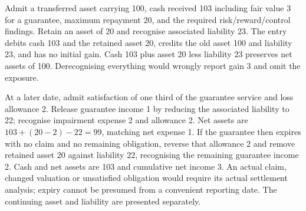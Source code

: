 Admit a transferred asset carrying 100, cash received 103 including fair value 3 for a guarantee, maximum repayment 20, and the required risk/reward/control findings. Retain an asset of 20 and recognise associated liability 23. The entry debits cash 103 and the retained asset 20, credits the old asset 100 and liability 23, and has no initial gain. Cash 103 plus asset 20 less liability 23 preserves net assets of 100. Derecognising everything would wrongly report gain 3 and omit the exposure.

At a later date, admit satisfaction of one third of the guarantee service and loss allowance 2. Release guarantee income 1 by reducing the associated liability to 22; recognise impairment expense 2 and allowance 2. Net assets are \(103+(20-2)-22=99\), matching net expense 1. If the guarantee then expires with no claim and no remaining obligation, reverse that allowance 2 and remove retained asset 20 against liability 22, recognising the remaining guarantee income 2. Cash and net assets are 103 and cumulative net income 3. An actual claim, changed valuation or unsatisfied obligation would require its actual settlement analysis; expiry cannot be presumed from a convenient reporting date. The continuing asset and liability are presented separately.
